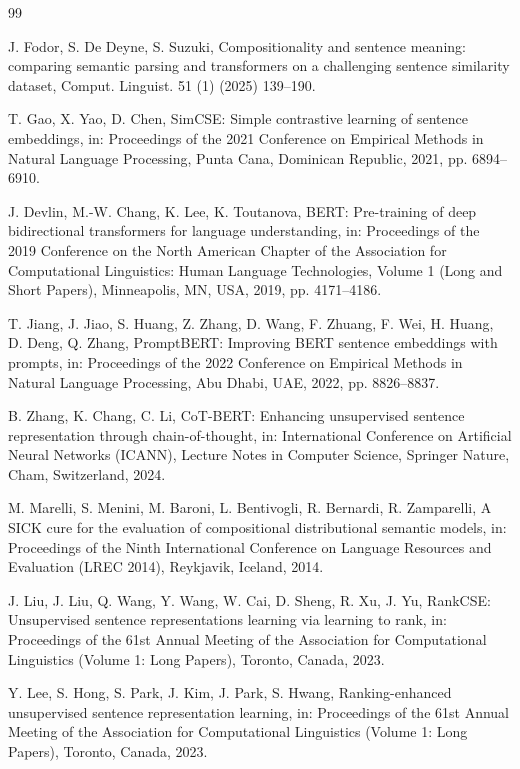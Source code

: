\documentclass[lettersize,journal]{IEEEtran}
\begin{document}
\begin{thebibliography}{99}

J. Fodor, S. De Deyne, S. Suzuki, Compositionality and sentence meaning: comparing semantic parsing and transformers on a challenging sentence similarity dataset, Comput. Linguist. 51 (1) (2025) 139--190.

T. Gao, X. Yao, D. Chen, SimCSE: Simple contrastive learning of sentence embeddings, in: Proceedings of the 2021 Conference on Empirical Methods in Natural Language Processing, Punta Cana, Dominican Republic, 2021, pp. 6894--6910.

J. Devlin, M.-W. Chang, K. Lee, K. Toutanova, BERT: Pre-training of deep bidirectional transformers for language understanding, in: Proceedings of the 2019 Conference on the North American Chapter of the Association for Computational Linguistics: Human Language Technologies, Volume 1 (Long and Short Papers), Minneapolis, MN, USA, 2019, pp. 4171--4186.

T. Jiang, J. Jiao, S. Huang, Z. Zhang, D. Wang, F. Zhuang, F. Wei, H. Huang, D. Deng, Q. Zhang, PromptBERT: Improving BERT sentence embeddings with prompts, in: Proceedings of the 2022 Conference on Empirical Methods in Natural Language Processing, Abu Dhabi, UAE, 2022, pp. 8826--8837.

B. Zhang, K. Chang, C. Li, CoT-BERT: Enhancing unsupervised sentence representation through chain-of-thought, in: International Conference on Artificial Neural Networks (ICANN), Lecture Notes in Computer Science, Springer Nature, Cham, Switzerland, 2024.

M. Marelli, S. Menini, M. Baroni, L. Bentivogli, R. Bernardi, R. Zamparelli, A SICK cure for the evaluation of compositional distributional semantic models, in: Proceedings of the Ninth International Conference on Language Resources and Evaluation (LREC 2014), Reykjavik, Iceland, 2014.

J. Liu, J. Liu, Q. Wang, Y. Wang, W. Cai, D. Sheng, R. Xu, J. Yu, RankCSE: Unsupervised sentence representations learning via learning to rank, in: Proceedings of the 61st Annual Meeting of the Association for Computational Linguistics (Volume 1: Long Papers), Toronto, Canada, 2023.

Y. Lee, S. Hong, S. Park, J. Kim, J. Park, S. Hwang, Ranking-enhanced unsupervised sentence representation learning, in: Proceedings of the 61st Annual Meeting of the Association for Computational Linguistics (Volume 1: Long Papers), Toronto, Canada, 2023.


\end{thebibliography}
\end{document}
